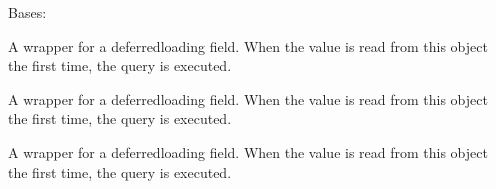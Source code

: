 \documentclass[letterpaper,10pt,spanish]{sphinxmanual}
\begin{document}
\begin{fulllineitems}

\begin{fulllineitems}
\label{\detokenize{modules/appprestamos:appprestamos.models.Prestamo.MultipleObjectsReturned}}
\pysigstartsignatures
{}
\pysigstopsignatures
\sphinxAtStartPar
Bases: 

\end{fulllineitems}


\begin{fulllineitems}
\label{\detokenize{modules/appprestamos:appprestamos.models.Prestamo.estado_prestamo}}
\pysigstartsignatures
{}
\pysigstopsignatures
\sphinxAtStartPar
A wrapper for a deferred\sphinxhyphen{}loading field. When the value is read from this
object the first time, the query is executed.

\end{fulllineitems}


\begin{fulllineitems}
\label{\detokenize{modules/appprestamos:appprestamos.models.Prestamo.fecha_devolucion_calculada}}
\pysigstartsignatures
{}
\pysigstopsignatures
\sphinxAtStartPar
A wrapper for a deferred\sphinxhyphen{}loading field. When the value is read from this
object the first time, the query is executed.

\end{fulllineitems}


\begin{fulllineitems}
\label{\detokenize{modules/appprestamos:appprestamos.models.Prestamo.fecha_devolucion_real}}
\pysigstartsignatures
{}
\pysigstopsignatures
\sphinxAtStartPar
A wrapper for a deferred\sphinxhyphen{}loading field. When the value is read from this
object the first time, the query is executed.


\end{fulllineitems}
\end{fulllineitems}
\end{document}
